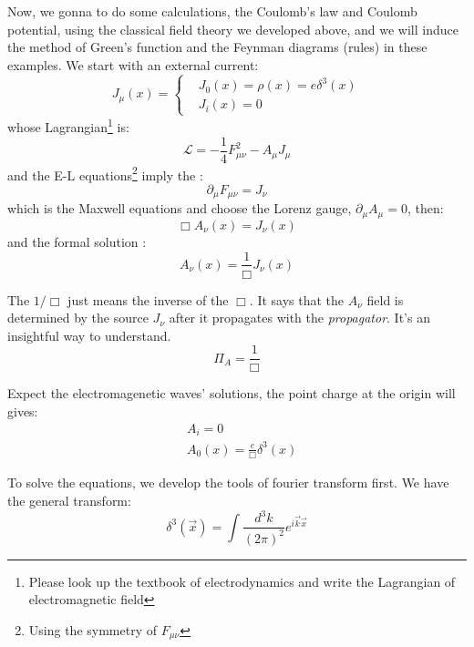\documentclass[12pt,openany]{book}
\begin{document}
	Now, we gonna to do some calculations, the Coulomb's law and Coulomb potential, using the classical field theory we developed above, and we will induce the method of Green's function
	and the Feynman diagrams (rules) in these examples.  We start with an external current:
	\begin{equation}
		J_\mu(x)=\begin{cases}
			&J_0(x)=\rho(x)=e\delta^3(x)\\
			&J_i(x)=0
		\end{cases}
	\end{equation}
	whose Lagrangian\footnote{Please look up the textbook of electrodynamics and write the Lagrangian of electromagnetic field} is:
	\begin{equation}
		\mathcal{L}=-\frac{1}{4}F^2_{\mu\nu}-A_{\mu}J_{\mu}
	\end{equation}
	and the E-L equations\footnote{Using the symmetry of $F_{\mu\nu}$} imply the :
	\begin{equation}
		\partial_\mu F_{\mu\nu}=J_\nu
	\end{equation}
	which is the Maxwell equations and choose the Lorenz gauge, $\partial_\mu A_\mu=0$, then:
	\begin{equation}
		\Box A_\nu(x)=J_\nu(x)
	\end{equation}
	and the formal solution :
	\begin{equation}
		A_\nu(x)=\frac{1}{\Box}J_\nu(x)
	\end{equation}\par 
	The $1/\Box$ just means the inverse of the $\Box$. It says that the $A_\nu$ field is determined by the source $J_\nu$ after it propagates with the 
	\textit{propagator}. It's an insightful way to understand.
	\begin{equation}
		\Pi_A=\frac{1}{\Box}
	\end{equation}\par 
	Expect the electromagenetic waves' solutions, the point charge at the origin will gives:
	\begin{equation}
		\begin{aligned}
			&A_i=0\\
			&A_0(x)=\frac{e}{\Box}\delta^3(x)
		\end{aligned}
	\end{equation}\par 
	To solve the equations, we develop the tools of fourier transform first. We have the general transform:
	\begin{equation}
		\delta^3(\vec{x})=\int\frac{d^3k}{(2\pi)^2}e^{i\vec{k}\vec{x}}
	\end{equation}\par 
\end{document}
